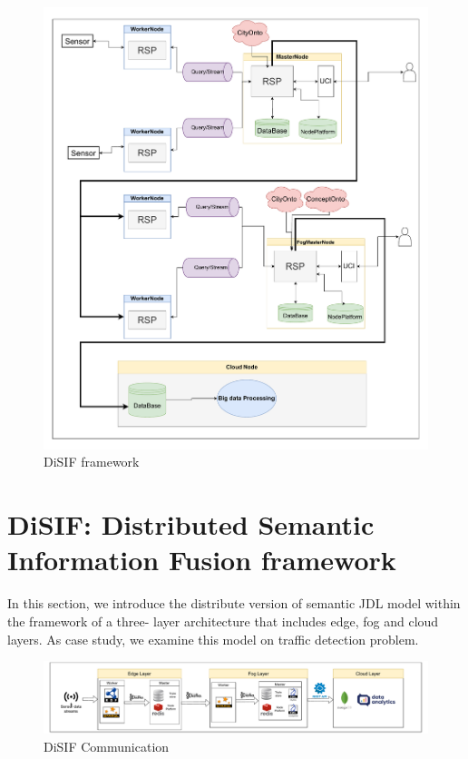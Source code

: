 \documentclass[5p,times]{elsarticle}
\begin{document}
\begin{figure}[t]
  \centering
  \includegraphics[width=\columnwidth]{AllinOneFrameWork_modified.drawio.pdf}
  \caption{DiSIF framework}
  \label{fig:overall}
\end{figure}









\section{DiSIF: Distributed Semantic Information Fusion framework}
In this section, we introduce the distribute version of semantic JDL model within the framework of a three- layer architecture that includes edge, fog and cloud layers. As case study, we examine this model on traffic detection problem.



\begin{figure}
    \centering
  
    \includegraphics[width=1\textwidth]{Overall_Framework_Communication_OK.drawio.pdf}
    \caption{DiSIF Communication}
    \label{fig:overall_communication}
  \end{figure}
\end{document}
